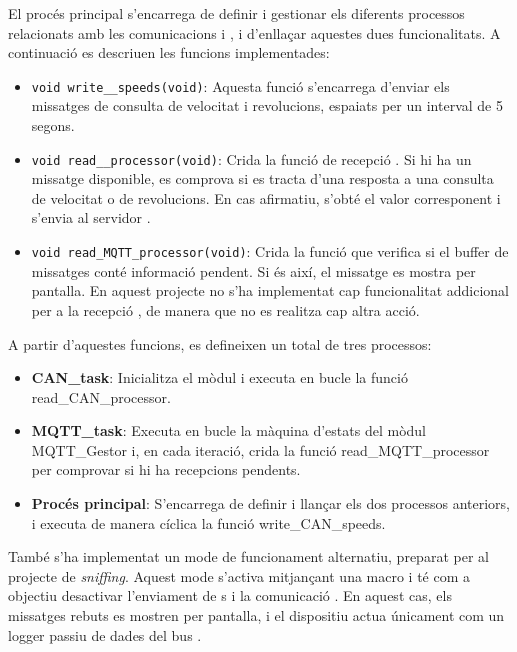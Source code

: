 \documentclass{tfgitic}[2024/07/01]
\begin{document}
El procés principal s'encarrega de definir i gestionar els diferents processos relacionats amb les comunicacions  i , i d'enllaçar aquestes 
dues funcionalitats. A continuació es descriuen les funcions implementades:

\begin{itemize}
  \item \texttt{void write\_\_speeds(void)}: Aquesta funció s'encarrega d'enviar els missatges  de consulta de velocitat i revolucions, 
  espaiats per un interval de 5 segons.

  \item \texttt{void read\_\_processor(void)}: Crida la funció de recepció . Si hi ha un missatge disponible, es comprova si es tracta d'una 
  resposta a una consulta de velocitat o de revolucions. En cas afirmatiu, s'obté el valor corresponent i s'envia al servidor .

  \item \texttt{void read\_MQTT\_processor(void)}: Crida la funció que verifica si el buffer de missatges  conté informació pendent. Si és 
  així, el missatge es mostra per pantalla. En aquest projecte no s'ha implementat cap funcionalitat addicional per a la recepció , de manera 
  que no es realitza cap altra acció.
\end{itemize}

A partir d'aquestes funcions, es defineixen un total de tres processos:

\begin{itemize}
  \item \textbf{CAN\_task}: Inicialitza el mòdul  i executa en bucle la funció read\_CAN\_processor.

  \item \textbf{MQTT\_task}: Executa en bucle la màquina d'estats del mòdul MQTT\_Gestor i, en cada iteració, crida la funció 
  read\_MQTT\_processor per comprovar si hi ha recepcions pendents.

  \item \textbf{Procés principal}: S'encarrega de definir i llançar els dos processos anteriors, i executa de manera cíclica la funció 
  write\_CAN\_speeds.
\end{itemize}

També s'ha implementat un mode de funcionament alternatiu, preparat per al projecte de \textit{sniffing}. Aquest mode s'activa mitjançant una 
macro i té com a objectiu desactivar l'enviament de s i la comunicació . En aquest cas, els missatges  rebuts es mostren per pantalla, 
i el dispositiu actua únicament com un logger passiu de dades del bus .
\end{document}
